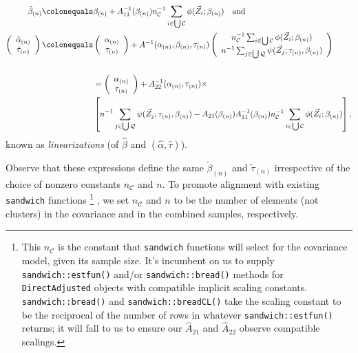\documentclass{article}
\newcommand{\defeq}{\ensuremath{\colonequals}}
\begin{document}
  \begin{align*}
   \tilde{\beta}_{(n)}
    \defeq& \beta_{(n)} + A_{11}^{-1}(\beta_{(n)})n_{\mathcal{C}}^{-1}\sum_{i\in \bigcup \mathcal{C}}\phi(\vec{Z}_{i}; \beta_{(n)})
  \quad \text{and}\\
    \left(\begin{array}{c}\tilde{\alpha}_{(n)}\\ \tilde{\tau}_{(n)} \end{array}\right)
    \defeq& \left(\begin{array}{c}\alpha_{(n)}\\
                    \tau_{(n)} \end{array}\right)
    + A^{-1}(\alpha_{(n)}, \beta_{(n)}, \tau_{(n)})\left(
    \begin{array}{c}
      n_{\mathcal{C}}^{-1}\sum_{i\in \bigcup
      \mathcal{C}}\phi(\vec{Z}_{i}; \beta_{(n)})\\
      n^{-1}\sum_{j\in \bigcup
                 \mathcal{Q}}\psi(\vec{Z}_{j};
                 \tau_{(n)},\beta_{(n)} )
    \end{array}
\right)\\
    \\
               &=\left(\begin{array}{c}\alpha_{(n)}\\
                         \tau_{(n)} \end{array}\right) +
    A_{22}^{-1}(\alpha_{(n)}, \tau_{(n)})\times \\
    & \left[
                 n^{-1}\sum_{j\in \bigcup
                 \mathcal{Q}}\psi(\vec{Z}_{j};
                 \tau_{(n)},\beta_{(n)} ) - A_{21}(\beta_{(n)}) A_{11}^{-1}(\beta_{(n)})n_{\mathcal{C}}^{-1}\sum_{i\in \bigcup \mathcal{C}}\phi(\vec{Z}_{i}; \beta_{(n)})\right],
\end{align*}
known as \textit{linearizations} (of $\hat\beta$ and $(\hat\alpha, \hat\tau)$).


Observe that these expressions define the same $\tilde{\beta}_{(n)}$ and $\tilde{\tau}_{(n)}$
  irrespective of the choice of nonzero constants $n_{\mathcal{C}}$
  and $n$.  To promote alignment with existing \texttt{sandwich}
  functions%
  \footnote{%
    This $n_{\mathcal{C}}$ is the constant that \texttt{sandwich} functions
will select for the covariance model, given its sample size.  It's
incumbent on us to supply \texttt{sandwich::estfun()} and/or
\texttt{sandwich::bread()} methods for \texttt{DirectAdjusted} objects
with compatible implicit
scaling constants. \texttt{sandwich::bread()} and
\texttt{sandwich::breadCL()} take the scaling constant to be the
reciprocal of the number of rows in whatever
\texttt{sandwich::estfun()} returns; it will fall to us to ensure our
$\hat{A}_{21}$ and $\hat{A}_{22}$ observe compatible scalings.}%
, we set $n_{\mathcal{C}}$ and $n$ to be the number of elements
(not clusters) in the covariance and in the combined samples,
respectively.
\end{document}
